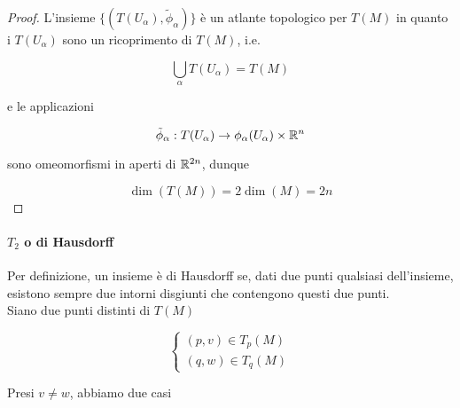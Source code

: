 \begin{proof}
	L'insieme $ \{(T(U_{\alpha}),\tilde{\phi}_{\alpha})\} $ è un atlante topologico per $ T(M) $ in quanto i $ T(U_{\alpha}) $ sono un ricoprimento di $ T(M) $, i.e.
	
	\begin{equation}
		\bigcup_{\alpha} T(U_{\alpha}) = T(M)
	\end{equation}
	
	e le applicazioni
	
	\begin{equation}
		\tilde{\phi}_{\alpha} : T(U_{\alpha}) \to \phi_{\alpha}(U_{\alpha}) \times \mathbb{R}^{n}
	\end{equation}
	
	sono omeomorfismi in aperti di $ \mathbb{R}^{2n} $, dunque
	
	\begin{equation}
		\dim(T(M)) = 2 \dim(M) = 2 n
	\end{equation}
\end{proof}

\paragraph{$ T_{2} $ o di Hausdorff}

Per definizione, un insieme è di Hausdorff se, dati due punti qualsiasi dell'insieme, esistono sempre due intorni disgiunti che contengono questi due punti.\\
Siano due punti distinti di $ T(M) $

\begin{equation}
	\begin{cases}
		(p,v) \in T_{p}(M) \\
		(q,w) \in T_{q}(M)
	\end{cases}
\end{equation}

Presi $ v \neq w $, abbiamo due casi

